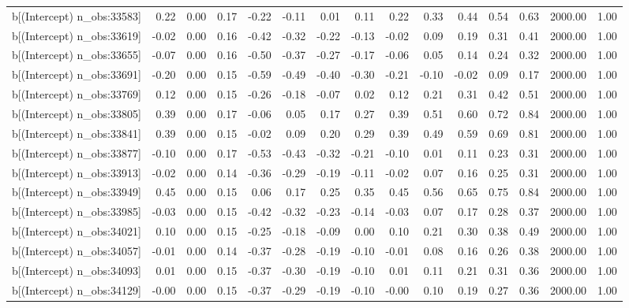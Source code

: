 \begin{table}[ht]
\begin{tabular}{rrrrrrrrrrrrrrr}
  b[(Intercept) n\_obs:33583] & 0.22 & 0.00 & 0.17 & -0.22 & -0.11 & 0.01 & 0.11 & 0.22 & 0.33 & 0.44 & 0.54 & 0.63 & 2000.00 & 1.00 \\ 
  b[(Intercept) n\_obs:33619] & -0.02 & 0.00 & 0.16 & -0.42 & -0.32 & -0.22 & -0.13 & -0.02 & 0.09 & 0.19 & 0.31 & 0.41 & 2000.00 & 1.00 \\ 
  b[(Intercept) n\_obs:33655] & -0.07 & 0.00 & 0.16 & -0.50 & -0.37 & -0.27 & -0.17 & -0.06 & 0.05 & 0.14 & 0.24 & 0.32 & 2000.00 & 1.00 \\ 
  b[(Intercept) n\_obs:33691] & -0.20 & 0.00 & 0.15 & -0.59 & -0.49 & -0.40 & -0.30 & -0.21 & -0.10 & -0.02 & 0.09 & 0.17 & 2000.00 & 1.00 \\ 
  b[(Intercept) n\_obs:33769] & 0.12 & 0.00 & 0.15 & -0.26 & -0.18 & -0.07 & 0.02 & 0.12 & 0.21 & 0.31 & 0.42 & 0.51 & 2000.00 & 1.00 \\ 
  b[(Intercept) n\_obs:33805] & 0.39 & 0.00 & 0.17 & -0.06 & 0.05 & 0.17 & 0.27 & 0.39 & 0.51 & 0.60 & 0.72 & 0.84 & 2000.00 & 1.00 \\ 
  b[(Intercept) n\_obs:33841] & 0.39 & 0.00 & 0.15 & -0.02 & 0.09 & 0.20 & 0.29 & 0.39 & 0.49 & 0.59 & 0.69 & 0.81 & 2000.00 & 1.00 \\ 
  b[(Intercept) n\_obs:33877] & -0.10 & 0.00 & 0.17 & -0.53 & -0.43 & -0.32 & -0.21 & -0.10 & 0.01 & 0.11 & 0.23 & 0.31 & 2000.00 & 1.00 \\ 
  b[(Intercept) n\_obs:33913] & -0.02 & 0.00 & 0.14 & -0.36 & -0.29 & -0.19 & -0.11 & -0.02 & 0.07 & 0.16 & 0.25 & 0.31 & 2000.00 & 1.00 \\ 
  b[(Intercept) n\_obs:33949] & 0.45 & 0.00 & 0.15 & 0.06 & 0.17 & 0.25 & 0.35 & 0.45 & 0.56 & 0.65 & 0.75 & 0.84 & 2000.00 & 1.00 \\ 
  b[(Intercept) n\_obs:33985] & -0.03 & 0.00 & 0.15 & -0.42 & -0.32 & -0.23 & -0.14 & -0.03 & 0.07 & 0.17 & 0.28 & 0.37 & 2000.00 & 1.00 \\ 
  b[(Intercept) n\_obs:34021] & 0.10 & 0.00 & 0.15 & -0.25 & -0.18 & -0.09 & 0.00 & 0.10 & 0.21 & 0.30 & 0.38 & 0.49 & 2000.00 & 1.00 \\ 
  b[(Intercept) n\_obs:34057] & -0.01 & 0.00 & 0.14 & -0.37 & -0.28 & -0.19 & -0.10 & -0.01 & 0.08 & 0.16 & 0.26 & 0.38 & 2000.00 & 1.00 \\ 
  b[(Intercept) n\_obs:34093] & 0.01 & 0.00 & 0.15 & -0.37 & -0.30 & -0.19 & -0.10 & 0.01 & 0.11 & 0.21 & 0.31 & 0.36 & 2000.00 & 1.00 \\ 
  b[(Intercept) n\_obs:34129] & -0.00 & 0.00 & 0.15 & -0.37 & -0.29 & -0.19 & -0.10 & -0.00 & 0.10 & 0.19 & 0.27 & 0.36 & 2000.00 & 1.00 \\ 

\end{tabular}
\end{table}
